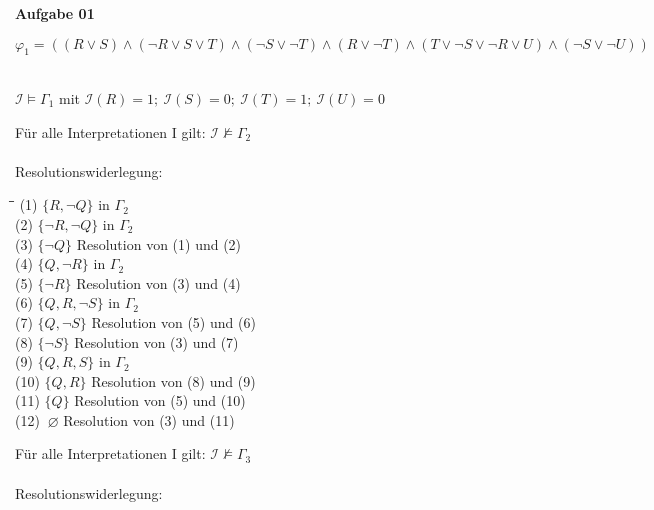 \documentclass[a4paper,10pt]{article}
\begin{document}
	\parindent0pt
	\textbf{Aufgabe 01}
	\begin{compactenum} [(a)]
		\item $ \varphi_1 = ((R\vee S) \wedge (\lnot R \vee S \vee T) \wedge (\lnot S \vee \lnot T)\wedge (R \vee \lnot T) \wedge (T\vee \lnot S \vee \lnot R \vee U) \wedge (\lnot S \vee \lnot U)) $\ \\
		\item \begin{compactitem}
			\item $ \mathcal{I} \models \Gamma_1 $ mit $ \mathcal{I}(R) = 1;\ \mathcal{I}(S) = 0;\ \mathcal{I}(T) = 1;\ \mathcal{I}(U) = 0$
			\item Für alle Interpretationen I gilt: $ \mathcal{I}\not\models\Gamma_2 $ \\ \\
			Resolutionswiderlegung:
			\begin{tabbing}
				\= \qquad \= \qquad\qquad\qquad \= \qquad\qquad \kill
				\>(1) \> $ \{R, \lnot Q\} $ \> in $ \Gamma_2 $ \\
				\>(2) \> $ \{\lnot R, \lnot Q\} $ \> in $ \Gamma_2 $ \\
				\>(3) \> $ \{\lnot Q \} $ \> Resolution von (1) und (2) \\
				\>(4) \> $ \{Q ,\lnot R\} $ \> in $ \Gamma_2 $\\
				\>(5) \> $ \{\lnot R\} $ \> Resolution von (3) und (4) \\
				\>(6) \> $ \{Q, R, \lnot S\} $ \> in $ \Gamma_2 $\\
				\>(7) \> $ \{Q, \lnot S\} $ \> Resolution von (5) und (6) \\
				\>(8) \> $ \{\lnot S\} $ \> Resolution von (3) und (7) \\
				\>(9) \> $ \{Q, R, S\} $ \> in $ \Gamma_2 $ \\
				\>(10) \> $ \{Q, R\} $ \> Resolution von (8) und (9) \\
				\>(11) \> $ \{Q\} $ \> Resolution von (5) und (10)\\
				\>(12) \> $ \ \varnothing $ \> Resolution von (3) und (11) \\
			\end{tabbing}
			\item Für alle Interpretationen I gilt: $ \mathcal{I}\not\models\Gamma_3 $ \\ \\
			Resolutionswiderlegung:
			

\end{compactitem}
\end{compactenum}
\end{document}
